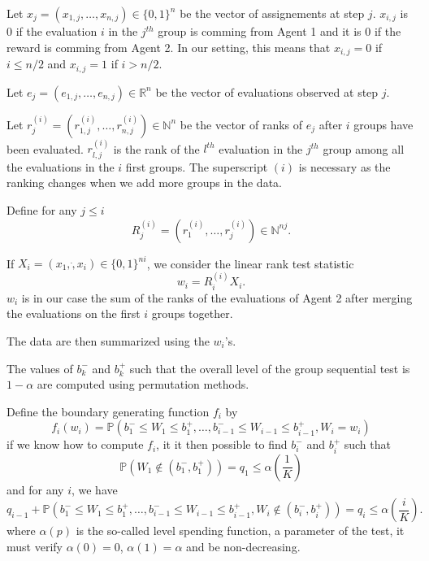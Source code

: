 \documentclass{article}
\theoremstyle{plain}
\theoremstyle{remark}
\renewcommand{\P}{\mathbb{P}}
\newcommand{\R}{\mathbb{R}}
\newcommand{\N}{\mathbb{N}}
\newcommand{\1}{\mathbbm{1}}
\numberwithin{equation}{section}
\begin{document}
Let $x_j=(x_{1,j},\dots,x_{n, j})\in \{0,1\}^n $ be the vector of assignements at step $j$. $x_{i,j}$ is $0$ if the evaluation $i$ in the $j^{th}$ group is comming from Agent 1 and it is $0$ if the reward is comming from  Agent 2. In our setting, this means that $x_{i,j}=0$ if $i \le n/2$ and $x_{i,j}=1$ if $i > n/2$. 

Let $e_j =(e_{1,j},\dots,e_{n,j}) \in \R^n$ be the vector of evaluations observed at step $j$. 

Let
$r_{j}^{(i)}=(r_{1,j}^{(i)},\dots,r_{n,j}^{(i)}) \in \N^n $ be the vector of ranks of $e_j$ after $i$ groups have been evaluated.  $r_{l,j}^{(i)}$ is the rank of the $l^{th}$ evaluation in the $j^{th}$ group among all the evaluations in the $i$ first groups. The superscript $(i)$ is necessary as the ranking changes when we add more groups in the data.

Define for any $j\le i$
$$R_j^{(i)}=(r_1^{(i)}, \dots,r_{j}^{(i)})\in \N^{nj}.$$


If $X_i=(x_1,\dot,x_i)\in \{0,1\}^{ni}$, we consider the linear rank test statistic
$$w_i=R_i^{(i)}X_i.$$
$w_i$ is in our case the sum of the ranks of the evaluations of Agent 2 after merging the evaluations on the first $i$ groups together.

The data are then summarized using the $w_i$'s.

The values of $b_k^-$ and $b_k^+$ such that the overall level of the group sequential test is $1-\alpha$ are computed using permutation methods.

Define the boundary generating function $f_i$ by 
$$f_i(w_i)=\P\left(b_1^-\le W_1\le b_1^+, \dots, b_{i-1}^-\le W_{i-1}\le b_{i-1}^+, W_i = w_i  \right)$$
if we know how to compute $f_i$, it it then possible to find $b_i^-$ and $b_i^+$ such that 
$$\P\left(W_1 \notin (b_1^-, b_1^+) \right)=q_1 \le \alpha\left(\frac{1}{K} \right) $$
and for any $i$, we have 
$$q_{i-1}+\P\left(b_1^-\le W_1\le b_1^+, \dots, b_{i-1}^-\le W_{i-1}\le b_{i-1}^+, W_i  \notin(b_i^-, b_i^+) \right)=q_i \le \alpha\left(\frac{i}{K} \right).$$
where $\alpha(p)$ is the so-called level spending function, a parameter of the test, it must verify $\alpha(0)=0$, $\alpha(1)=\alpha$ and be non-decreasing.
\end{document}
